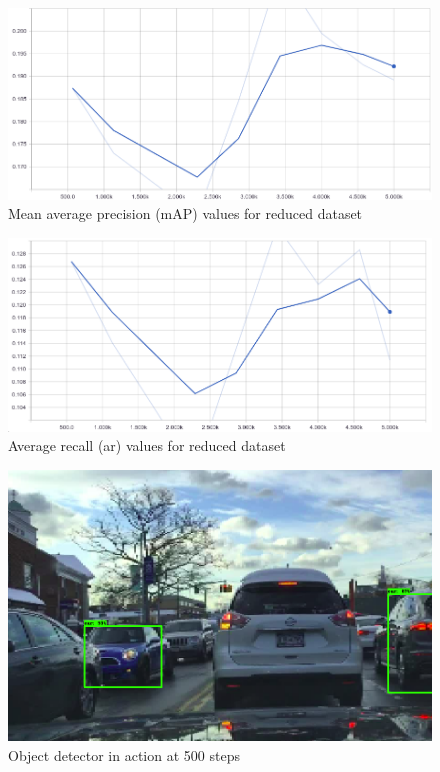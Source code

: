 \documentclass[12pt]{report}
\begin{document}
\vspace{0.5cm}
\begin{figure}[ht!]
	\centering
	\includegraphics[width=12cm]{map-smalldata-5k}
	\caption{Mean average precision (mAP) values for reduced dataset}
	\label{fig:map-smalldata-5k}
\end{figure}

\vspace{0.5cm}
\begin{figure}[ht!]
	\centering
	\includegraphics[width=12cm]{ar-smalldata-5k}
	\caption{Average recall (ar) values for reduced dataset}
	\label{fig:ar-smalldata-5k}
\end{figure}

\vspace{0.5cm}
\begin{figure}[ht!]
	\centering
	\includegraphics[width=15cm]{class-smalldata-500}
	\caption{Object detector in action at 500 steps}
	\label{fig:class-smalldata-500}
\end{figure}
\end{document}
